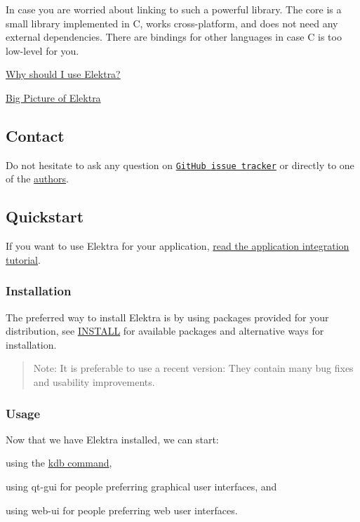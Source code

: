 In case you are worried about linking to such a powerful library. The core is a small library implemented in C, works cross-\/platform, and does not need any external dependencies. There are bindings for other languages in case C is too low-\/level for you.


\begin{DoxyItemize}
\item \hyperlink{doc_WHY_md}{Why should I use Elektra?}
\item \hyperlink{doc_BIGPICTURE_md}{Big Picture of Elektra}
\end{DoxyItemize}

\subsection*{Contact}

Do not hesitate to ask any question on \href{https://issues.libelektra.org/}{\tt Git\+Hub issue tracker} or directly to one of the \hyperlink{doc_AUTHORS_md}{authors}.

\subsection*{Quickstart}

If you want to use Elektra for your application, \hyperlink{doc_tutorials_application-integration_md}{read the application integration tutorial}.

\subsubsection*{Installation}

The preferred way to install Elektra is by using packages provided for your distribution, see \hyperlink{doc_INSTALL_md}{I\+N\+S\+T\+A\+LL} for available packages and alternative ways for installation.

\begin{quote}
Note\+: It is preferable to use a recent version\+: They contain many bug fixes and usability improvements. \end{quote}


\subsubsection*{Usage}

Now that we have Elektra installed, we can start\+:


\begin{DoxyItemize}
\item using the \hyperlink{doc_help_kdb_md}{kdb command},
\item using qt-\/gui for people preferring graphical user interfaces, and
\item using web-\/ui for people preferring web user interfaces.
\end{DoxyItemize}

